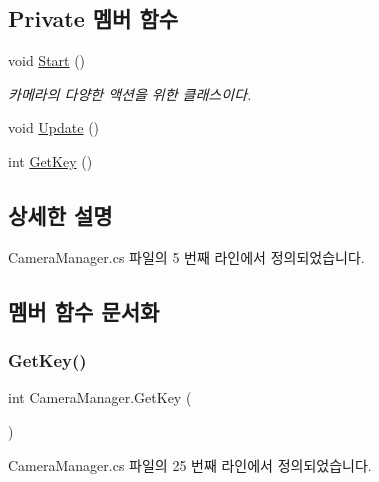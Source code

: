 \subsection*{Private 멤버 함수}
\begin{DoxyCompactItemize}
\item 
void \mbox{\hyperlink{class_camera_manager_a5010f55d95e2b09bf041387388a38ec1}{Start}} ()
\begin{DoxyCompactList}\small\item\em 카메라의 다양한 액션을 위한 클래스이다. \end{DoxyCompactList}\item 
void \mbox{\hyperlink{class_camera_manager_a10cfc1f1e06a1ebd569c60b48261a692}{Update}} ()
\item 
int \mbox{\hyperlink{class_camera_manager_a5584b064b34b716fd1d3f1307717b1cb}{Get\+Key}} ()
\end{DoxyCompactItemize}


\subsection{상세한 설명}


Camera\+Manager.\+cs 파일의 5 번째 라인에서 정의되었습니다.



\subsection{멤버 함수 문서화}
\mbox{\label{class_camera_manager_a5584b064b34b716fd1d3f1307717b1cb}} 
\subsubsection{\texorpdfstring{GetKey()}{GetKey()}}
{\footnotesize\ttfamily int Camera\+Manager.\+Get\+Key (\begin{DoxyParamCaption}{ }\end{DoxyParamCaption})\hspace{0.3cm}{\ttfamily [private]}}



Camera\+Manager.\+cs 파일의 25 번째 라인에서 정의되었습니다.


\begin{DoxyCode}{0}

\end{DoxyCode}
\mbox{\label{class_camera_manager_a5010f55d95e2b09bf041387388a38ec1}} 
